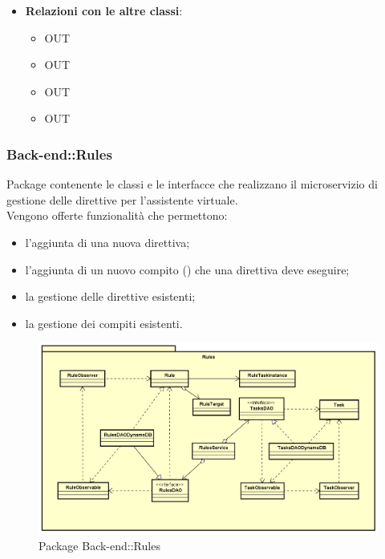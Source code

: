 \begin{itemize}
\begin{itemize}
\begin{itemize}
		\end{itemize}
	\end{itemize}
	\item \textbf{Relazioni con le altre classi}:
	\begin{itemize}
		\item OUT \hyperlink{LambdaContext_label}{}
		\item OUT \hyperlink{LambdaEvent_label}{}
		\item OUT \hyperlink{NotificationChannel_label}{}
		\item OUT \hyperlink{NotificationMessage_label}{}
	\end{itemize}
\end{itemize}
\FloatBarrier

\subsubsection{Back-end::Rules}
Package contenente le classi e le interfacce che realizzano il microservizio di gestione delle direttive per l'assistente virtuale.\\
Vengono offerte funzionalità che permettono:
\begin{itemize}
\item l'aggiunta di una nuova direttiva;
\item l'aggiunta di un nuovo compito () che una direttiva deve eseguire;
\item la gestione delle direttive esistenti;
\item la gestione dei compiti esistenti.
\end{itemize}
\begin{figure}[h] \centering \includegraphics[width=\textwidth,height=\textheight,keepaspectratio]{images/diagrams/back-end/Official_Backend_0304/Rules.png}
	\caption{Package Back-end::Rules}
\end{figure}
\newpage

